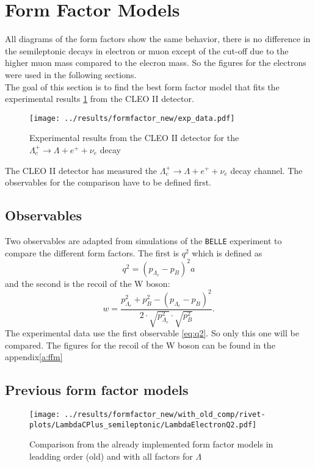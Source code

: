 \clearpage
\section{Form Factor Models}
All diagrams of the form factors show the same behavior, there is no difference 
in the semileptonic decays in electron or muon except of the cut-off due to 
the higher muon mass compared to the elecron mass. So the figures for 
the electrons were used in the following sections.\\
The goal of this section is to find the best form factor model that fits 
the experimental results {\ref{gr:data}} from the CLEO II detector{\cite{data}}.
\begin{figure}[h]
  \centering
  \texttt{[image: ../results/formfactor\_new/exp\_data.pdf]}
  \caption{Experimental results from the CLEO II detector for the 
  \(\Lambda_c^+ \rightarrow \Lambda + e^+ + \nu_e\) decay} \label{gr:data}
\end{figure}
The CLEO II detector has measured the \(\Lambda_c^+ \rightarrow \Lambda + e^+ + \nu_e\)
 decay channel. The observables for the comparison have to be defined first.

\subsection{Observables}
Two observables are adapted from simulations of the \texttt{BELLE} experiment 
to compare the different form factors.
The first is \(q^2\) which is defined as
\begin{equation}
  q^2 = \left( p_{\Lambda_c} - p_B \right)^2a \label{eq:q2}
\end{equation}
and the second is the recoil of the W boson:
\begin{equation}
  w = \frac{p^2_{\Lambda_c} +  p^2_B - \left( p_{\Lambda_c} - p_B \right)^2}
  {2 \cdot \sqrt{p^2_{\Lambda_c}} \cdot \sqrt{p^2_B}}. \label{eq:w}
\end{equation}
The experimental data use the first observable {\eqref{eq:q2}}. So only this 
one will be compared. The figures for the recoil of the W boson can be found 
in the appendix{\ref{a:ffm}}

\subsection{Previous form factor models}
\begin{figure}[h]
  \centering
  \texttt{[image: ../results/formfactor\_new/with\_old\_comp/rivet-plots/LambdaCPlus\_semileptonic/LambdaElectronQ2.pdf]}
  \caption{Comparison from the already implemented form factor models in leadding order (old)
  and with all factors for \(\Lambda\)} \label{gr:with_old_comp}
\end{figure}

